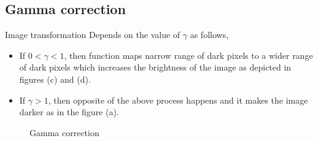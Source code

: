 \documentclass[a4paper,10pt]{article}%
\begin{document}
\subsection{Gamma correction}
Image transformation Depends on the value of $\gamma$ as follows,
\begin{itemize}
	\item If $0< \gamma <1$, then function maps narrow range of dark pixels to a wider range of dark pixels which increases the brightness of the image as depicted in figures (c) and (d).

	\item If $\gamma >1$, then opposite of the above process happens and it makes the image darker as in the figure (a).
\end{itemize}
\begin{figure}[!h]
	\centering
	\caption{Gamma correction}
\end{figure}
\end{document}
